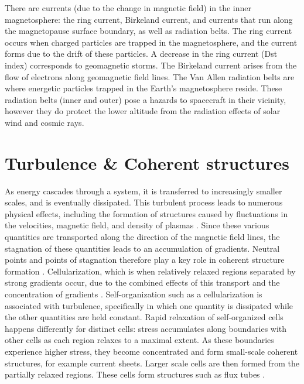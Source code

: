 There are currents (due to the change in magnetic field) in the inner magnetosphere: the ring current, Birkeland current, and currents that run along the magnetopause surface boundary, as well as radiation belts. The ring current occurs when charged particles are trapped in the magnetosphere, and the current forms due to the drift of these particles. A decrease in the ring current (Dst index) corresponds to geomagnetic storms. The Birkeland current arises from the flow of electrons along geomagnetic field lines. The Van Allen radiation belts are where energetic particles trapped in the Earth's magnetosphere reside. These radiation belts (inner and outer) pose a hazards to spacecraft in their vicinity, however they do protect the lower altitude from the radiation effects of solar wind and cosmic rays.

\section{Turbulence \& Coherent structures}
As energy cascades through a system, it is transferred to increasingly smaller scales, and is eventually dissipated. This turbulent process leads to numerous physical effects, including the formation of structures caused by fluctuations in the velocities, magnetic field, and density of plasmas \citep{Matthaeus:2015}. Since these various quantities are transported along the direction of the magnetic field lines, the stagnation of these quantities leads to an accumulation of gradients. Neutral points and points of stagnation therefore play a key role in coherent structure formation \citep{Matthaeus:2015}. Cellularization, which is when relatively relaxed regions separated by strong gradients occur, due to the combined effects of this transport and the concentration of gradients \citep{Matthaeus:2015}. Self-organization such as a cellularization is associated with turbulence, specifically in which one quantity is dissipated while the other quantities are held constant. Rapid relaxation of self-organized cells happens differently for distinct cells: stress accumulates along boundaries with other cells as each region relaxes to a maximal extent. As these boundaries experience higher stress, they become concentrated and form small-scale coherent structures, for example current sheets. Larger scale cells are then formed from the partially relaxed regions. These cells form structures such as flux tubes \citep{Matthaeus:2015}.


